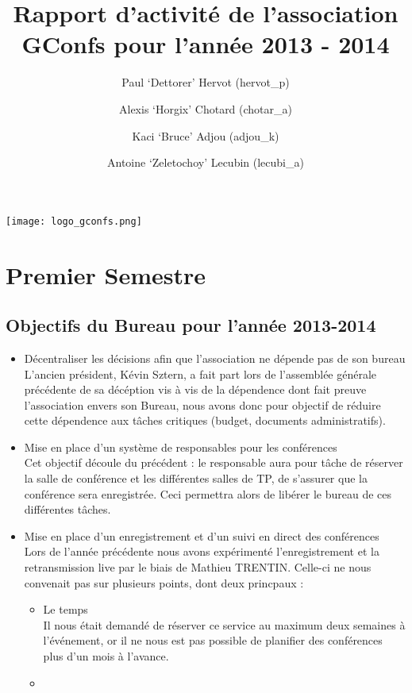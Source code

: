 \documentclass[12pt]{report}
\title{Rapport d'activité de l'association GConfs pour l'année 2013 - 2014}
\author{Paul `Dettorer' Hervot (hervot\_p)
        \and Alexis `Horgix' Chotard (chotar\_a)
        \and Kaci `Bruce' Adjou (adjou\_k)
        \and Antoine `Zeletochoy' Lecubin (lecubi\_a)}
\begin{document}
  \begin{titlepage}
    \texttt{[image: logo\_gconfs.png]} \\
    {\let\newpage\relax\maketitle}
  \end{titlepage}
  \chapter{Premier Semestre}
  \section{Objectifs du Bureau pour l'année 2013-2014}
  \begin{itemize}
    \item
      Décentraliser les décisions afin que l'association ne dépende pas de son
      bureau\\ L'ancien président, Kévin Sztern, a fait part lors de l'assemblée
      générale précédente de sa décéption vis à vis de la dépendence dont fait
      preuve l'association envers son Bureau, nous avons donc pour objectif de
      réduire cette dépendence aux tâches critiques (budget, documents
      administratifs).
    \item
      Mise en place d'un système de responsables pour les conférences\\ Cet
      objectif découle du précédent : le responsable aura pour tâche de réserver
      la salle de conférence et les différentes salles de TP, de s'assurer que
      la conférence sera enregistrée.  Ceci permettra alors de libérer le bureau
      de ces différentes tâches.
    \item
      Mise en place d'un enregistrement et d'un suivi en direct des
      conférences\\ Lors de l'année précédente nous avons expérimenté
      l'enregistrement et la retransmission live par le biais de Mathieu
      TRENTIN. Celle-ci ne nous convenait pas sur plusieurs points, dont deux
      princpaux :
      \begin{itemize}
        \item
          Le temps \\ Il nous était demandé de réserver ce service au maximum
          deux semaines à l'événement, or il ne nous est pas possible de
          planifier des conférences plus d'un mois à l'avance.
        \item

\end{itemize}
\end{itemize}
\end{document}
